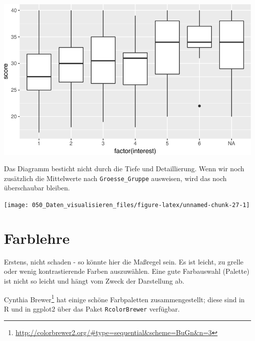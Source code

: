 \documentclass[12pt,]{book}
\newenvironment{Shaded}{\begin{snugshade}}{\end{snugshade}}
\newcommand{\KeywordTok}[1]{\textcolor[rgb]{0.13,0.29,0.53}{\textbf{{#1}}}}
\newcommand{\DataTypeTok}[1]{\textcolor[rgb]{0.13,0.29,0.53}{{#1}}}
\newcommand{\StringTok}[1]{\textcolor[rgb]{0.31,0.60,0.02}{{#1}}}
\newcommand{\NormalTok}[1]{{#1}}
\let\rmarkdownfootnote\footnote%
\def\footnote{\protect\rmarkdownfootnote}
\begin{document}
\begin{center}\includegraphics[width=0.7\linewidth]{050_Daten_visualisieren_files/figure-latex/unnamed-chunk-26-1} \end{center}

Das Diagramm besticht nicht durch die Tiefe und Detaillierung. Wenn wir
noch zusätzlich die Mittelwerte nach \texttt{Groesse\_Gruppe} ausweisen,
wird das noch überschaubar bleiben.

\begin{Shaded}
\end{Shaded}

\begin{center}\texttt{[image: 050\_Daten\_visualisieren\_files/figure-latex/unnamed-chunk-27-1]} \end{center}

\section{Farblehre}\label{farblehre}

Erstens, nicht schaden - so könnte hier die Maßregel sein. Es ist
leicht, zu grelle oder wenig kontrastierende Farben auszuwählen. Eine
gute Farbauswahl (Palette) ist nicht so leicht und hängt vom Zweck der
Darstellung ab.

Cynthia Brewer\footnote{\url{http://colorbrewer2.org/\#type=sequential\&scheme=BuGn\&n=3}}
hat einige schöne Farbpaletten zusammengestellt; diese sind in R und in
ggplot2 über das Paket \texttt{RcolorBrewer} verfügbar.
\end{document}
